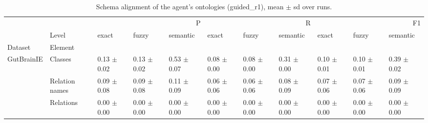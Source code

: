 \begin{table}
\caption{Schema alignment of the agent's ontologies (guided_r1), mean $\pm$ sd over runs.}
\label{tab:onto_schema_guided_r1}
\begin{tabular}{lllllllllll}
\toprule
 &  & \multicolumn{3}{r}{P} & \multicolumn{3}{r}{R} & \multicolumn{3}{r}{F1} \\
 & Level & exact & fuzzy & semantic & exact & fuzzy & semantic & exact & fuzzy & semantic \\
Dataset & Element &  &  &  &  &  &  &  &  &  \\
\midrule
\multirow[t]{3}{*}{GutBrainIE} & Classes & 0.13 $\pm$ 0.02 & 0.13 $\pm$ 0.02 & 0.53 $\pm$ 0.07 & 0.08 $\pm$ 0.00 & 0.08 $\pm$ 0.00 & 0.31 $\pm$ 0.00 & 0.10 $\pm$ 0.01 & 0.10 $\pm$ 0.01 & 0.39 $\pm$ 0.02 \\
 & Relation names & 0.09 $\pm$ 0.08 & 0.09 $\pm$ 0.08 & 0.11 $\pm$ 0.09 & 0.06 $\pm$ 0.06 & 0.06 $\pm$ 0.06 & 0.08 $\pm$ 0.09 & 0.07 $\pm$ 0.06 & 0.07 $\pm$ 0.06 & 0.09 $\pm$ 0.09 \\
 & Relations & 0.00 $\pm$ 0.00 & 0.00 $\pm$ 0.00 & 0.00 $\pm$ 0.00 & 0.00 $\pm$ 0.00 & 0.00 $\pm$ 0.00 & 0.00 $\pm$ 0.00 & 0.00 $\pm$ 0.00 & 0.00 $\pm$ 0.00 & 0.00 $\pm$ 0.00 \\
\cline{1-11}
\bottomrule
\end{tabular}
\end{table}
